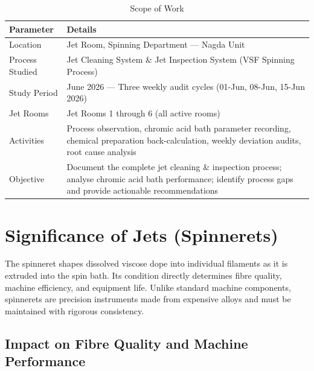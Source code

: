 \documentclass{book}
\begin{document}
\begin{table}[H]
  \centering
  \caption{Scope of Work}
  \label{tab:scope}
  \begin{tabular}{L{4cm} L{9cm}}
    \toprule
    \color{white}\textbf{Parameter} & \color{white}\textbf{Details} \\
    \midrule
    Location         & Jet Room, Spinning Department --- Nagda Unit \\
    Process Studied  & Jet Cleaning System \& Jet Inspection System (VSF Spinning Process) \\
    Study Period     & June 2026 --- Three weekly audit cycles (01-Jun, 08-Jun, 15-Jun 2026) \\
    Jet Rooms        & Jet Rooms 1 through 6 (all active rooms) \\
    Activities       & Process observation, chromic acid bath parameter recording, chemical preparation back-calculation, weekly deviation audits, root cause analysis \\
    Objective        & Document the complete jet cleaning \& inspection process; analyse chromic acid bath performance; identify process gaps and provide actionable recommendations \\
    \bottomrule
  \end{tabular}
\end{table}

\chapter{Significance of Jets (Spinnerets)}

The spinneret shapes dissolved viscose dope into individual filaments as it is extruded into the spin bath. Its condition directly determines fibre quality, machine efficiency, and equipment life. Unlike standard machine components, spinnerets are precision instruments made from expensive alloys and must be maintained with rigorous consistency.

\section{Impact on Fibre Quality and Machine Performance}
\end{document}
